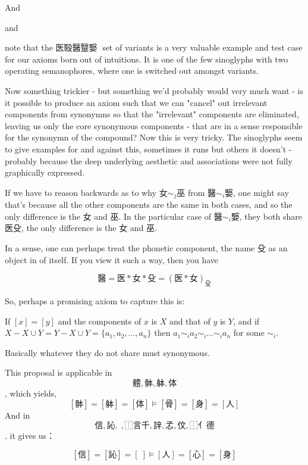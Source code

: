 And 

and 

note that the 医殹醫毉嫛𮋺 set of variants is a very valuable example and test case for our axioms born out of intuitions. It is one of the few sinoglyphs with two operating semanophores, where one is switched out amongst variants. 


Now something trickier - but something we'd probably would very much want - is it possible to produce an axiom such that we can "cancel" out irrelevant components from synonymns so that the "irrelevant" components are eliminated, leaving us only the core synonymous components - that are in a sense responsible for the synonymn of the compound? Now this is very tricky. The sinoglyphs seem to give examples for and against this, sometimes it runs but others it doesn't - probably because the deep underlying aesthetic and associations were not fully graphically expressed. 

If we have to reason backwards as to why  $\text{女}\sim_j\text{巫}$ from $\text{醫}\sim_i\text{嫛}$, one might say that's because all the other components are the same in both cases, and so the only difference is the 女 and 巫. In the particular case of $\text{醫}\sim_i\text{嫛}$, they both share 医殳, the only difference is the 女 and 巫.

In a sense, one can perhaps treat the phonetic component, the name 殳 as an object in of itself. If you view it such a way, then you have

$$\text{醫}=\text{医}*\text{女}*\text{殳} = (\text{医}*\text{女})_{\text{殳}}$$

So, perhaps a promising axiom to capture this is: 

If $[x]=[y]$ and the components of $x$ is $X$ and that of $y$ is $Y$, and if $X - X \cup Y = Y - X \cup Y = \{a_1, a_2, \ldots, a_n\}$ then $a_1 \sim_i a_2 \sim_i \ldots \sim_i a_n$ for some $\sim_i$.



Basically whatever they do not share must synonymous. 

This proposal is applicable in $$\text{體} , \text{骵}, \text{躰}, \text{体}$$, which yields,
$$[\text{骵}]=[\text{躰}]=[\text{体}] \models [\text{骨}]=[\text{身}]=[\text{人}]$$
And in $$\text{信},\text{訫},\text{𬢭},\text{⿰言千},\text{䛨},\text{孞},\text{伩},\text{⿰亻德}$$, it gives us：

$$[\text{信}]=[\text{訫}]=[\text{𬢭}] \models [\text{人}]=[\text{心}]=[\text{身}]$$

